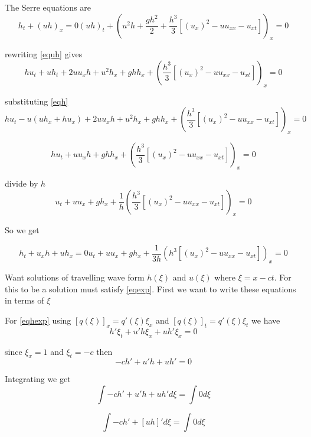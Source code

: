 \documentclass[subeqn]{article}
\begin{document}
The Serre equations are
\begin{subequations}
	\begin{equation}
	\label{eqh}
	h_t + (uh)_x = 0
	\end{equation}
	\begin{equation}
	\label{equh}
	(uh)_t + \left(u^2h + \frac{gh^2}{2} + \frac{h^3}{3} \left[\left(u_x \right)^2 - uu_{xx} - u_{xt} \right]\right)_x = 0
	\end{equation}
\end{subequations}

rewriting \eqref{equh} gives
\[hu_t + uh_t + 2u u_x h + u^2h_x + ghh_x + \left(\frac{h^3}{3} \left[\left(u_x \right)^2 - uu_{xx} - u_{xt} \right]\right)_x  = 0\]

substituting  \eqref{eqh}
\[hu_t - u\left(uh_x + hu_x\right) + 2u u_x h + u^2h_x + ghh_x + \left(\frac{h^3}{3} \left[\left(u_x \right)^2 - uu_{xx} - u_{xt} \right]\right)_x = 0\]

\[hu_t +  u u_x h + ghh_x + \left(\frac{h^3}{3} \left[\left(u_x \right)^2 - uu_{xx} - u_{xt} \right]\right)_x = 0\]

divide by $h$
\[u_t +  u u_x  + gh_x + \frac{1}{h} \left(\frac{h^3}{3} \left[\left(u_x \right)^2 - uu_{xx} - u_{xt} \right]\right)_x = 0\]

So we get

\begin{subequations}
	\label{eqexp}
	\begin{equation}
	\label{eqhexp}
	h_t + u_xh + u h_x = 0
	\end{equation}
	\begin{equation}
	\label{equhexp}
	u_t +  u u_x  + gh_x + \frac{1}{3h} \left({h^3}\left[\left(u_x \right)^2 - uu_{xx} - u_{xt} \right]\right)_x = 0	
	\end{equation}
\end{subequations}

Want solutions of travelling wave form $h(\xi)$ and $u(\xi)$ where $\xi = x - ct$. For this to be a solution must satisfy \eqref{eqexp}. First we want to write these equations in terms of $\xi$

For \eqref{eqhexp} using $[q(\xi)]_x = q'(\xi)\xi_x$ and $[q(\xi)]_t = q'(\xi)\xi_t$ we have
\[h' \xi_t + u'h\xi_x + u h'\xi_x = 0\]

since $\xi_x = 1$ and $\xi_t = -c$ then
\[-c h' + u'h + u h' = 0\]

Integrating we get
\[ \int -c h' + u'h + u h' d\xi =  \int 0 d\xi\]

\[ \int -c h' + \left[uh\right]' d\xi =  \int 0 d\xi\]
\end{document}

